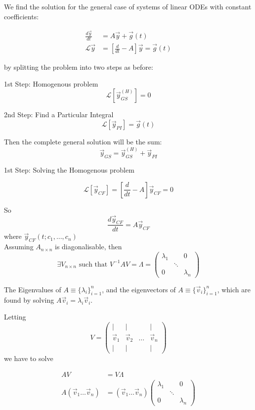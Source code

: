 \documentclass[twoside]{scrartcl}
\begin{document}
We find the solution for the general case of systems of linear ODEs with constant coefficients:

\[
\begin{aligned}
  \frac{d\vec{y}}{dt} &= A\vec{y} + \vec{g}(t)\\
  \mathcal{L}\vec{y} &= \left[\frac{d}{dt} - A\right] \vec{y} = \vec{g}(t)
\end{aligned}
\]


by splitting the problem into two steps as before: 

1st Step: Homogenous problem
\[\mathcal{L}[\vec{y}_{GS}^{(H)}] = 0\]

2nd Step: Find a Particular Integral 
\[\mathcal{L}[\vec{y}_{PI}]= \vec{g}(t)\]

Then the complete general solution will be the sum: 
\[\vec{y}_{GS} = \vec{y}_{GS}^{(H)} + \vec{y}_{PI}\]


1st Step: Solving the Homogenous problem

\[\mathcal{L}[\vec{y}_{CF}] = \left[\frac{d}{dt} - A\right]\vec{y}_{CF} = 0\]

So 
\[\frac{d\vec{y}_{CF}}{dt} = A\vec{y}_{CF}\]
where $\vec{y}_{CF}(t;c_1,\dots,c_n)$\\


Assuming $A_{n \times n}$ is diagonalisable, then 
\[\exists V_{n \times n} \text{ such that } V^{-1}AV = \Lambda = \begin{pmatrix}
 \lambda_1 & & 0 \\
 & \ddots & \\
 0 & & \lambda_n	
 \end{pmatrix}\]

The Eigenvalues of $A \equiv \{\lambda_i\}_{i=1}^n$, and the eigenvectors of $A \equiv \{\vec{v}_i\}_{i=1}^n$, which are found by solving $A\vec{v}_i = \lambda_i\vec{v}_i$.

 Letting \[V = \begin{pmatrix}
 | & | &  & | \\
 \vec{v}_1 & \vec{v}_2 & \dots & \vec{v}_n\\
 | & | &  & | 
 \end{pmatrix}\]
  we have to solve 
 
 \[
\begin{aligned}
  AV &= V\Lambda\\
  A(\vec{v}_1\dots \vec{v}_n) &= (\vec{v}_1\dots\vec{v}_n)\begin{pmatrix}
 \lambda_1 & & 0 \\
 & \ddots & \\
 0 & & \lambda_n	
 \end{pmatrix}
\end{aligned}
\]
\end{document}
